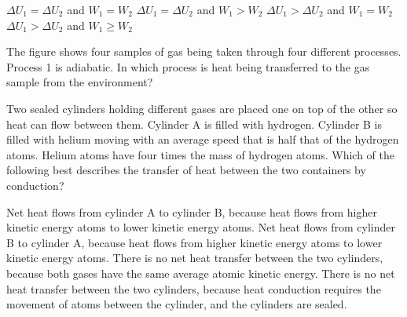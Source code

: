 \documentclass{../../../oss-ap12ibhl-print}
\begin{document}
\begin{questions}
  \begin{minipage}{.35\textwidth}
  \end{minipage}
  \begin{minipage}{.4\textwidth}
    \begin{choices}
      \choice $\Delta U_1 = \Delta U_2$ and $W_1= W_2$
      \choice $\Delta U_1 = \Delta U_2$ and $W_1>W_2$
      \choice $\Delta U_1 > \Delta U_2$ and $W_1=W_2$
      \choice $\Delta U_1 > \Delta U_2$ and $W_1\geq W_2$
    \end{choices}
  \end{minipage}
  
  \question The figure shows four samples of gas being taken through four
  different processes. Process 1 is adiabatic. In which process is heat being
  transferred to the gas sample from the environment?

  \begin{minipage}{.35\textwidth}
  \end{minipage}
  \begin{minipage}{.2\textwidth}
    \begin{choices}
    \end{choices}
  \end{minipage}
    
  \question Two sealed cylinders holding different gases are placed one on top
  of the other so heat can flow between them. Cylinder A is filled with
  hydrogen. Cylinder B is filled with helium moving with an average speed that
  is half that of the hydrogen atoms. Helium atoms have four times the mass of
  hydrogen atoms. Which of the following best describes the transfer of heat
  between the two containers by conduction?
  \begin{choices}
    \choice Net heat flows from cylinder A to cylinder B, because heat flows
    from higher kinetic energy atoms to lower kinetic energy atoms.
    \choice Net heat flows from cylinder B to cylinder A, because heat flows
    from higher kinetic energy atoms to lower kinetic energy atoms.
    \choice There is no net heat transfer between the two cylinders, because
    both gases have the same average atomic kinetic energy.
    \choice There is no net heat transfer between the two cylinders, because
    heat conduction requires the movement of atoms between the cylinder, and the
    cylinders are sealed.
  \end{choices}
  \newpage
  

\end{questions}
\end{document}
